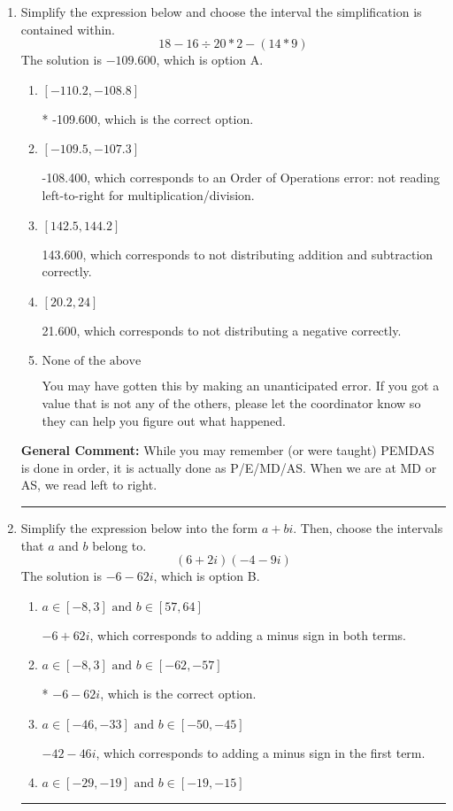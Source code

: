 \documentclass{extbook}[14pt]
\newcommand{\litem}[1]{\item #1

\rule{\textwidth}{0.4pt}}
\begin{document}
\begin{enumerate}
{ Irrational numbers are more than just square root of 3: adding or subtracting values from square root of 3 is also irrational.
}
\litem{
Simplify the expression below and choose the interval the simplification is contained within.
\[ 18 - 16 \div 20 * 2 - (14 * 9) \]The solution is \( -109.600 \), which is option A.\begin{enumerate}[label=\Alph*.]
\item \( [-110.2, -108.8] \)

* -109.600, which is the correct option.
\item \( [-109.5, -107.3] \)

 -108.400, which corresponds to an Order of Operations error: not reading left-to-right for multiplication/division.
\item \( [142.5, 144.2] \)

 143.600, which corresponds to not distributing addition and subtraction correctly.
\item \( [20.2, 24] \)

 21.600, which corresponds to not distributing a negative correctly.
\item \( \text{None of the above} \)

 You may have gotten this by making an unanticipated error. If you got a value that is not any of the others, please let the coordinator know so they can help you figure out what happened.
\end{enumerate}

\textbf{General Comment:} While you may remember (or were taught) PEMDAS is done in order, it is actually done as P/E/MD/AS. When we are at MD or AS, we read left to right.
}
\litem{
Simplify the expression below into the form $a+bi$. Then, choose the intervals that $a$ and $b$ belong to.
\[ (6 + 2 i)(-4 - 9 i) \]The solution is \( -6 - 62 i \), which is option B.\begin{enumerate}[label=\Alph*.]
\item \( a \in [-8, 3] \text{ and } b \in [57, 64] \)

 $-6 + 62 i$, which corresponds to adding a minus sign in both terms.
\item \( a \in [-8, 3] \text{ and } b \in [-62, -57] \)

* $-6 - 62 i$, which is the correct option.
\item \( a \in [-46, -33] \text{ and } b \in [-50, -45] \)

 $-42 - 46 i$, which corresponds to adding a minus sign in the first term.
\item \( a \in [-29, -19] \text{ and } b \in [-19, -15] \)


\end{enumerate}}
\end{enumerate}
\end{document}
